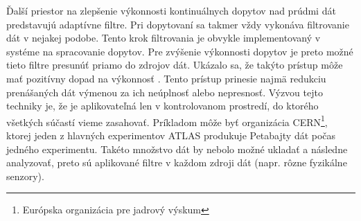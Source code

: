 \par
Ďalší priestor na zlepšenie výkonnosti kontinuálnych dopytov nad prúdmi dát predstavujú adaptívne filtre. Pri dopytovaní sa takmer vždy vykonáva filtrovanie dát v nejakej podobe. Tento krok filtrovania je obvykle implementovaný v systéme na spracovanie dopytov. Pre zvýšenie výkonnosti dopytov je preto možné tieto filtre presunúť priamo do zdrojov dát. Ukázalo sa, že takýto prístup môže mať pozitívny dopad na výkonnosť \citep{olston2003adaptive}. Tento prístup prinesie najmä redukciu prenášaných dát výmenou za ich neúplnosť alebo nepresnosť. Výzvou tejto techniky je, že je aplikovateľná len v kontrolovanom prostredí, do ktorého všetkých súčastí vieme zasahovať. Príkladom môže byť organizácia CERN\footnote{Európska organizácia pre jadrový výskum}, ktorej jeden z hlavných experimentov ATLAS produkuje Petabajty dát počas jedného experimentu. Takéto množstvo dát by nebolo možné ukladať a následne analyzovať, preto sú aplikované filtre v každom zdroji dát (napr. rôzne fyzikálne senzory).



